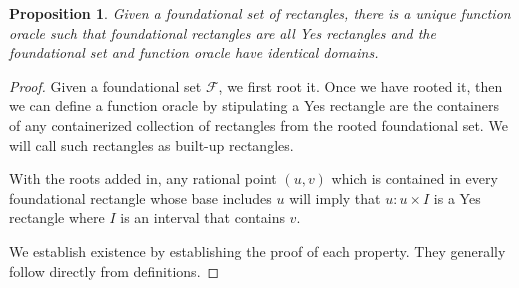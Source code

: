 \documentclass[12pt]{article}
\newtheorem{proposition}{Proposition}[section]
\begin{document}
\begin{proposition}\label{pr:foundation}
    Given a foundational set of rectangles, there is a unique function oracle such that foundational rectangles are all Yes rectangles and the foundational set and function oracle have identical domains. 
\end{proposition}



\begin{proof}
Given a foundational set $\mathcal{F}$, we first root it. Once we have rooted it, then we can define a function oracle by stipulating a Yes rectangle are the containers of any containerized collection of rectangles from the rooted foundational set. We will call such rectangles as built-up rectangles. 

With the roots added in, any rational point $(u,v)$ which is contained in every foundational rectangle whose base includes $u$ will imply that $u:u \times I$ is a Yes rectangle where $I$ is an interval that contains $v$. 
    
    We establish existence by establishing the proof of each property. They generally follow directly from definitions. 


\end{proof}
\end{document}
